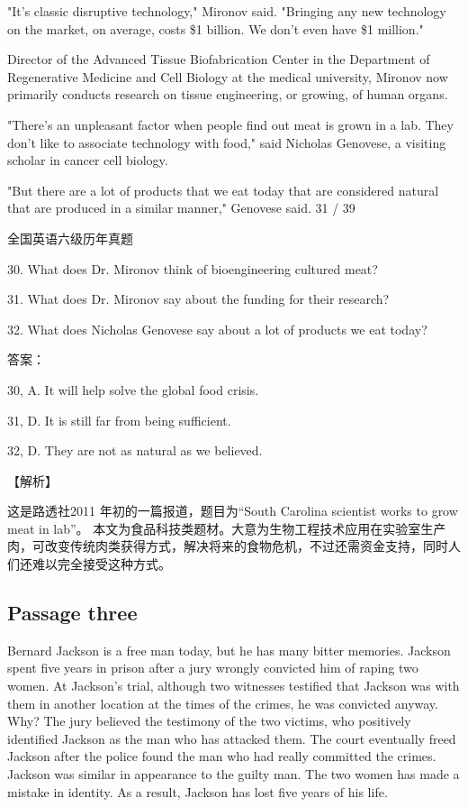 \documentclass[UTF8,11pt]{ctexart}
\begin{document}
"It's classic disruptive technology," Mironov said. "Bringing any new technology on the market, on average, costs \$1 billion. We don't even have \$1 million."


Director of the Advanced Tissue Biofabrication Center in the Department of Regenerative Medicine and Cell Biology at the medical university, Mironov now primarily conducts research on tissue engineering, or growing, of human organs.


"There's an unpleasant factor when people find out meat is grown in a lab. They don't like to associate technology with food," said Nicholas Genovese, a visiting scholar in cancer cell biology.


"But there are a lot of products that we eat today that are considered natural that are produced in a similar manner," Genovese said. 31 / 39


全国英语六级历年真题


30. What does Dr. Mironov think of bioengineering cultured meat?


31. What does Dr. Mironov say about the funding for their research?


32. What does Nicholas Genovese say about a lot of products we eat today?


答案：


30, A. It will help solve the global food crisis.


31, D. It is still far from being sufficient.


32, D. They are not as natural as we believed.


【解析】


这是路透社2011 年初的一篇报道，题目为“South Carolina scientist works to grow meat in lab”。 本文为食品科技类题材。大意为生物工程技术应用在实验室生产肉，可改变传统肉类获得方式，解决将来的食物危机，不过还需资金支持，同时人们还难以完全接受这种方式。


\subsection*{\textbf{Passage three}}


Bernard Jackson is a free man today, but he has many bitter memories. Jackson spent five years in prison after a jury wrongly convicted him of raping two women. At Jackson's trial, although two witnesses testified that Jackson was with them in another location at the times of the crimes, he was convicted anyway. Why? The jury believed the testimony of the two victims, who positively identified Jackson as the man who has attacked them. The court eventually freed Jackson after the police found the man who had really committed the crimes. Jackson was similar in appearance to the guilty man. The two women has made a mistake in identity. As a result, Jackson has lost five years of his life.
\end{document}
